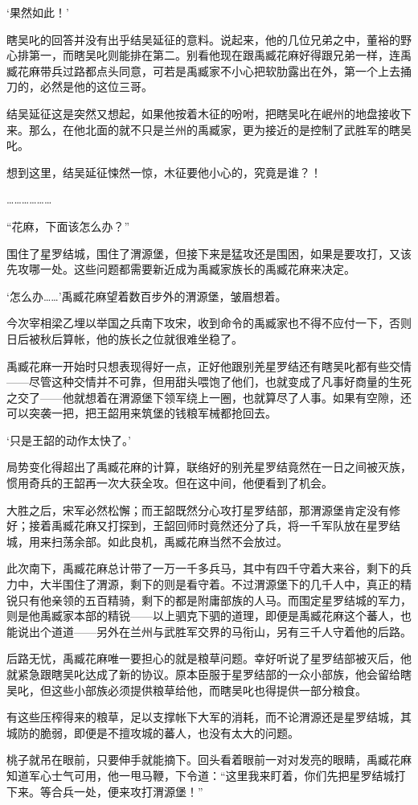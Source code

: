‘果然如此！’

瞎吴叱的回答并没有出乎结吴延征的意料。说起来，他的几位兄弟之中，董裕的野心排第一，而瞎吴叱则能排在第二。别看他现在跟禹臧花麻好得跟兄弟一样，连禹臧花麻带兵过路都点头同意，可若是禹臧家不小心把软肋露出在外，第一个上去捅刀的，必然是他的这位三哥。

结吴延征这是突然又想起，如果他按着木征的吩咐，把瞎吴叱在岷州的地盘接收下来。那么，在他北面的就不只是兰州的禹臧家，更为接近的是控制了武胜军的瞎吴叱。

想到这里，结吴延征悚然一惊，木征要他小心的，究竟是谁？！

………………

“花麻，下面该怎么办？”

围住了星罗结城，围住了渭源堡，但接下来是猛攻还是围困，如果是要攻打，又该先攻哪一处。这些问题都需要新近成为禹臧家族长的禹臧花麻来决定。

‘怎么办……’禹臧花麻望着数百步外的渭源堡，皱眉想着。

今次宰相梁乙埋以举国之兵南下攻宋，收到命令的禹臧家也不得不应付一下，否则日后被秋后算帐，他的族长之位就很难坐稳了。

禹臧花麻一开始时只想表现得好一点，正好他跟别羌星罗结还有瞎吴叱都有些交情——尽管这种交情并不可靠，但用甜头喂饱了他们，也就变成了凡事好商量的生死之交了——他就想着在渭源堡下领军绕上一圈，也就算尽了人事。如果有空隙，还可以突袭一把，把王韶用来筑堡的钱粮军械都抢回去。

‘只是王韶的动作太快了。’

局势变化得超出了禹臧花麻的计算，联络好的别羌星罗结竟然在一日之间被灭族，惯用奇兵的王韶再一次大获全攻。但在这中间，他便看到了机会。

大胜之后，宋军必然松懈；而王韶既然分心攻打星罗结部，那渭源堡肯定没有修好；接着禹臧花麻又打探到，王韶回师时竟然还分了兵，将一千军队放在星罗结城，用来扫荡余部。如此良机，禹臧花麻当然不会放过。

此次南下，禹臧花麻总计带了一万一千多兵马，其中有四千守着大来谷，剩下的兵力中，大半围住了渭源，剩下的则是看守着。不过渭源堡下的几千人中，真正的精锐只有他亲领的五百精骑，剩下的都是附庸部族的人马。而围定星罗结城的军力，则是他禹臧家本部的精锐——以上驷克下驷的道理，即便是禹臧花麻这个蕃人，也能说出个道道——另外在兰州与武胜军交界的马衔山，另有三千人守着他的后路。

后路无忧，禹臧花麻唯一要担心的就是粮草问题。幸好听说了星罗结部被灭后，他就紧急跟瞎吴叱达成了新的协议。原本臣服于星罗结部的一众小部族，他会留给瞎吴叱，但这些小部族必须提供粮草给他，而瞎吴叱也得提供一部分粮食。

有这些压榨得来的粮草，足以支撑帐下大军的消耗，而不论渭源还是星罗结城，其城防的脆弱，即便是不擅攻城的蕃人，也没有太大的问题。

桃子就吊在眼前，只要伸手就能摘下。回头看着眼前一对对发亮的眼睛，禹臧花麻知道军心士气可用，他一甩马鞭，下令道：“这里我来盯着，你们先把星罗结城打下来。等合兵一处，便来攻打渭源堡！”

